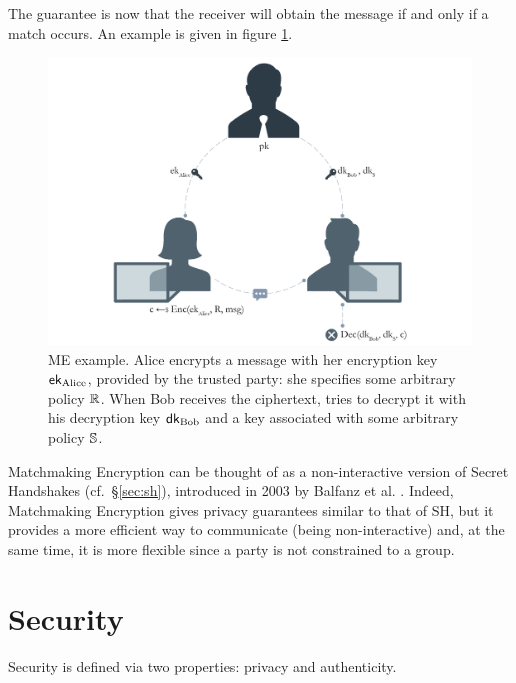 The guarantee is now that the receiver will obtain the message if and only if a match occurs.
An example is given in figure \ref{fig:me_example}.
\begin{figure}[ht]
    \centering
    \includegraphics[width=\linewidth]{images/me.png}
    \caption{ME example. Alice encrypts a message with her encryption key $\mathsf{ek}_{\mathrm{Alice}}$, provided by the trusted party: she specifies some arbitrary policy $\mathbb{R}$. When Bob receives the ciphertext, tries to decrypt it with his decryption key $\mathsf{dk}_{\mathrm{Bob}}$ and a key associated with some arbitrary policy $\mathbb{S}$.}
    \label{fig:me_example}
\end{figure}
\newline\newline
Matchmaking Encryption can be thought of as a non-interactive version of Secret Handshakes (cf.\ \S\ref{sec:sh}), introduced in 2003 by Balfanz et al. \cite{Balfanz}.
Indeed, Matchmaking Encryption gives privacy guarantees similar to that of SH, but it provides a more efficient way to communicate (being non-interactive) and, at the same time, it is more flexible since a party is not constrained to a group.

\section{Security}
Security is defined via two properties: privacy and authenticity.

